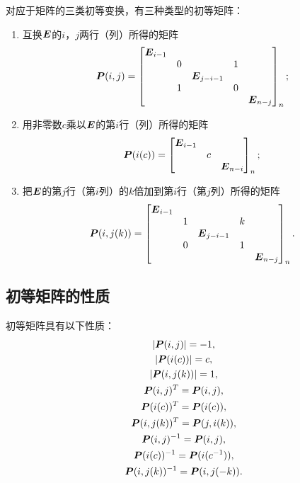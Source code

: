 对应于矩阵的三类初等变换，有三种类型的初等矩阵：
\begin{enumerate}
	\item 互换\(\boldsymbol{E}\)的\(i\)，\(j\)两行（列）所得的矩阵\begin{equation*}
		\boldsymbol{P}(i,j) = \begin{bmatrix}
			\boldsymbol{E}_{i-1} & & & \\
			& 0 & & 1 & \\
			& & \boldsymbol{E}_{j-i-1} & & \\
			& 1 & & 0 & \\
			& & & & \boldsymbol{E}_{n-j}
		\end{bmatrix}_n;
	\end{equation*}
	\item 用非零数\(c\)乘以\(\boldsymbol{E}\)的第\(i\)行（列）所得的矩阵\begin{equation*}
		\boldsymbol{P}(i(c)) = \begin{bmatrix}
			\boldsymbol{E}_{i-1} & & \\
			& c & \\
			& & \boldsymbol{E}_{n-i}
		\end{bmatrix}_n;
	\end{equation*}
	\item 把\(\boldsymbol{E}\)的第\(j\)行（第\(i\)列）的\(k\)倍加到第\(i\)行（第\(j\)列）所得的矩阵\begin{equation*}
		\boldsymbol{P}(i,j(k)) = \begin{bmatrix}
			\boldsymbol{E}_{i-1} & & & \\
			& 1 & & k & \\
			& & \boldsymbol{E}_{j-i-1} & & \\
			& 0 & & 1 & \\
			& & & & \boldsymbol{E}_{n-j}
		\end{bmatrix}_n.
	\end{equation*}
\end{enumerate}

\subsection{初等矩阵的性质}
\begin{property}\label{theorem:逆矩阵.初等矩阵的性质1}
初等矩阵具有以下性质：\begin{gather}
	\abs{\boldsymbol{P}(i,j)} = -1, \\
	\abs{\boldsymbol{P}(i(c))} = c, \\
	\abs{\boldsymbol{P}(i,j(k))} = 1, \\
	\boldsymbol{P}(i,j)^T = \boldsymbol{P}(i,j), \\
	\boldsymbol{P}(i(c))^T = \boldsymbol{P}(i(c)), \\
	\boldsymbol{P}(i,j(k))^T = \boldsymbol{P}(j,i(k)), \\
	\boldsymbol{P}(i,j)^{-1} = \boldsymbol{P}(i,j), \\
	\boldsymbol{P}(i(c))^{-1} = \boldsymbol{P}(i(c^{-1})), \\
	\boldsymbol{P}(i,j(k))^{-1} = \boldsymbol{P}(i,j(-k)).
\end{gather}
\end{property}

